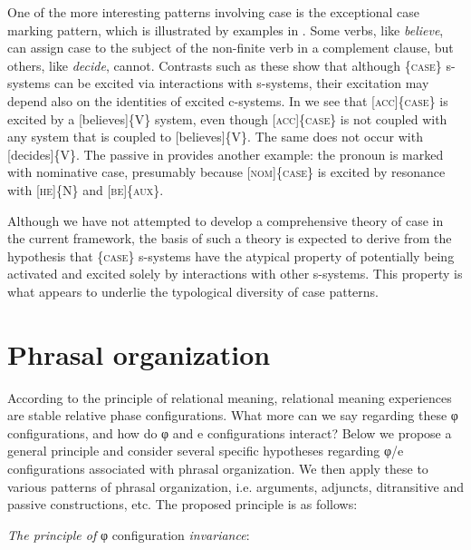   One of the more interesting patterns involving case is the exceptional case marking pattern, which is illustrated by examples in . Some verbs, like \textit{believe}, can assign case to the subject of the non-finite verb in a complement clause, but others, like \textit{decide}, cannot. Contrasts such as these show that although \{\textsc{case}\} s-systems can be excited via interactions with s-systems, their excitation may depend also on the identities of excited c-systems. In  we see that \textsc{[acc]\{case\}} is excited by a [believes]\{V\} system, even though \textsc{[acc]\{case\}} is not coupled with any system that is coupled to [believes]\{V\}. The same does not occur with [decides]\{V\}. The passive in  provides another example: the pronoun is marked with nominative case, presumably because [\textsc{nom}]\{\textsc{case}\} is excited by resonance with [\textsc{he}]\{N\} and [\textsc{be}]\{\textsc{aux}\}.

  \ea\label{ex:4:2}
  \z
  \z
  Although we have not attempted to develop a comprehensive theory of case in the current framework, the basis of such a theory is expected to derive from the hypothesis that \{\textsc{case}\} s-systems have the atypical property of potentially being activated and excited solely by interactions with other s-systems. This property is what appears to underlie the typological diversity of case patterns. 

\section{Phrasal organization}

According to the principle of relational meaning, relational meaning experiences are stable relative phase configurations. What more can we say regarding these φ configurations, and how do φ and e configurations interact? Below we propose a general principle and consider several specific hypotheses regarding φ/e configurations associated with phrasal organization. We then apply these to various patterns of phrasal organization, i.e. arguments, adjuncts, ditransitive and passive constructions, etc. The proposed principle is as follows:

\textit{The principle of} φ configuration \textit{invariance}: 

